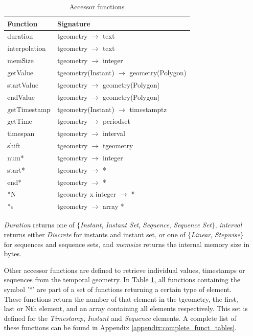 \begin{table}[h!]
    \centering
    \begin{tabularx}{\textwidth}{|l|X|}
    \hline
    \textbf{Function}   & \textbf{Signature} \\ 
    \hline
    duration            & tgeometry $\rightarrow$ text\\
    \hline
    interpolation       & tgeometry $\rightarrow$ text\\
    \hline
    memSize             & tgeometry $\rightarrow$ integer \\
    \hline
    getValue            & tgeometry(Instant) $\rightarrow$ geometry(Polygon) \\
    \hline
    startValue          & tgeometry $\rightarrow$ geometry(Polygon) \\
    \hline
    endValue            & tgeometry $\rightarrow$ geometry(Polygon) \\
    \hline
    getTimestamp        & tgeometry(Instant) $\rightarrow$ timestamptz \\
    \hline
    getTime             & tgeometry $\rightarrow$ periodset \\
    \hline
    timespan            & tgeometry $\rightarrow$ interval \\
    \hline
    shift               & tgeometry $\rightarrow$ tgeometry \\
    \hline
    num*                & tgeometry $\rightarrow$ integer \\
    \hline
    start*              & tgeometry $\rightarrow$ * \\
    \hline
    end*                & tgeometry $\rightarrow$ * \\
    \hline
    *N                  & tgeometry x integer $\rightarrow$ *\\
    \hline
    *s                  & tgeometry $\rightarrow$ array *\\
    \hline
    \end{tabularx}
    \caption{Accessor functions}
    \label{table:accessor_funcs}
\end{table}

\textit{Duration} returns one of $\{$\textit{Instant}, \textit{Instant Set}, \textit{Sequence}, \textit{Sequence Set}$\}$, \textit{interval} returns either \textit{Discrete} for instants and instant set, or one of $\{$\textit{Linear}, \textit{Stepwise}$\}$ for sequences and sequence sets, and \textit{memsize} returns the internal memory size in bytes.

Other accessor functions are defined to retrieve individual values, timestamps or sequences from the temporal geometry. In Table \ref{table:accessor_funcs}, all functions containing the symbol '*' are part of a set of functions returning a certain type of element. These functions return the number of that element in the tgeometry, the first, last or Nth element, and an array containing all elements respectively. This set is defined for the \textit{Timestamp}, \textit{Instant} and \textit{Sequence} elements. A complete list of these functions can be found in Appendix \ref{appendix:complete_funct_tables}.


